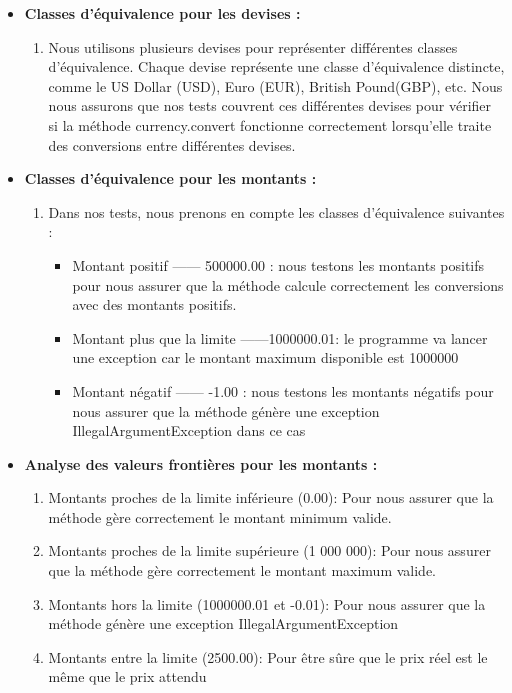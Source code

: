 \documentclass[letterpaper, 10pt]{article}
\begin{document}
\begin{itemize}
    \item \textbf{Classes d'équivalence pour les devises :}
        \begin{enumerate}
          \item Nous utilisons plusieurs devises pour représenter différentes classes d'équivalence. Chaque devise représente une classe d'équivalence distincte, comme le US Dollar (USD), Euro (EUR),  British Pound(GBP), etc. Nous nous assurons que nos tests couvrent ces différentes devises pour vérifier si la méthode currency.convert fonctionne correctement lorsqu'elle traite des conversions entre différentes devises.
        \end{enumerate}
    \item \textbf{Classes d'équivalence pour les montants :}
        \begin{enumerate}
            \item Dans nos tests, nous prenons en compte les classes d'équivalence suivantes :
            \begin{itemize}
            
            \item Montant positif —— 500000.00 : nous testons les montants positifs pour nous assurer que la méthode calcule correctement les conversions avec des montants positifs.
            
            \item Montant plus que la limite ——1000000.01: le programme va lancer une exception car le montant maximum disponible est 1000000
            
            \item  Montant négatif —— -1.00 : nous testons les montants négatifs pour nous assurer que la méthode génère une exception IllegalArgumentException dans ce cas
        \end{itemize}
        \end{enumerate}
        
    \item \textbf{Analyse des valeurs frontières pour les montants :}
        \begin{enumerate}
            \item  Montants proches de la limite inférieure (0.00): Pour nous assurer que la méthode gère correctement le montant minimum valide.
            \item Montants proches de la limite supérieure (1 000 000): Pour nous assurer que la méthode gère correctement le montant maximum valide.
            \item Montants hors la limite (1000000.01 et -0.01): Pour nous assurer que la méthode génère une exception IllegalArgumentException
            \item Montants entre la limite (2500.00): Pour être sûre que le prix réel est le même que le prix attendu
        \end{enumerate}


\end{itemize}
\end{document}

